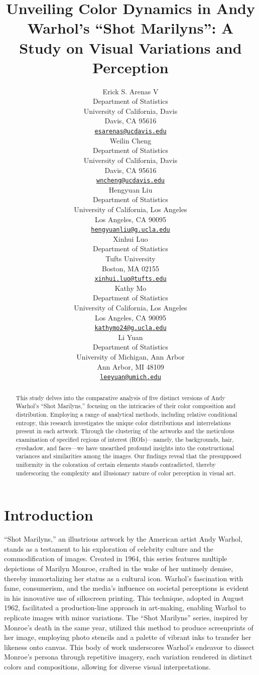 \documentclass{article}
\title{Unveiling Color Dynamics in Andy Warhol's ``Shot Marilyns'': A
Study on Visual Variations and Perception}
\author{
    Erick S. Arenas V
   \\
    Department of Statistics \\
    University of California, Davis \\
  Davis, CA 95616 \\
  \texttt{\href{mailto:esarenas@ucdavis.edu}{\nolinkurl{esarenas@ucdavis.edu}}} \\
   \And
    Weilin Cheng
   \\
    Department of Statistics \\
    University of California, Davis \\
  Davis, CA 95616 \\
  \texttt{\href{mailto:wncheng@ucdavis.edu}{\nolinkurl{wncheng@ucdavis.edu}}} \\
   \And
    Hengyuan Liu
   \\
    Department of Statistics \\
    University of California, Los Angeles \\
  Los Angeles, CA 90095 \\
  \texttt{\href{mailto:hengyuanliu@g.ucla.edu}{\nolinkurl{hengyuanliu@g.ucla.edu}}} \\
   \And
    Xinhui Luo
   \\
    Department of Statistics \\
    Tufts University \\
  Boston, MA 02155 \\
  \texttt{\href{mailto:xinhui.luo@tufts.edu}{\nolinkurl{xinhui.luo@tufts.edu}}} \\
   \And
    Kathy Mo
   \\
    Department of Statistics \\
    University of California, Los Angeles \\
  Los Angeles, CA 90095 \\
  \texttt{\href{mailto:kathymo24@g.ucla.edu}{\nolinkurl{kathymo24@g.ucla.edu}}} \\
   \And
    Li Yuan
   \\
    Department of Statistics \\
    University of Michigan, Ann Arbor \\
  Ann Arbor, MI 48109 \\
  \texttt{\href{mailto:leeyuan@umich.edu}{\nolinkurl{leeyuan@umich.edu}}} \\
  }
\begin{document}
\maketitle


\begin{abstract}
This study delves into the comparative analysis of five distinct
versions of Andy Warhol's ``Shot Marilyns,'' focusing on the intricacies
of their color composition and distribution. Employing a range of
analytical methods, including relative conditional entropy, this
research investigates the unique color distributions and interrelations
present in each artwork. Through the clustering of the artworks and the
meticulous examination of specified regions of interest (ROIs)---namely,
the backgrounds, hair, eyeshadow, and faces---we have unearthed profound
insights into the constructional variances and similarities among the
images. Our findings reveal that the presupposed uniformity in the
coloration of certain elements stands contradicted, thereby underscoring
the complexity and illusionary nature of color perception in visual art.
\end{abstract}


\hypertarget{introduction}{%
\section{Introduction}\label{introduction}}

``Shot Marilyns,'' an illustrious artwork by the American artist Andy
Warhol, stands as a testament to his exploration of celebrity culture
and the commodification of images. Created in 1964, this series features
multiple depictions of Marilyn Monroe, crafted in the wake of her
untimely demise, thereby immortalizing her status as a cultural icon.
Warhol's fascination with fame, consumerism, and the media's influence
on societal perceptions is evident in his innovative use of silkscreen
printing. This technique, adopted in August 1962, facilitated a
production-line approach in art-making, enabling Warhol to replicate
images with minor variations. The ``Shot Marilyns'' series, inspired by
Monroe's death in the same year, utilized this method to produce
screenprints of her image, employing photo stencils and a palette of
vibrant inks to transfer her likeness onto canvas. This body of work
underscores Warhol's endeavor to dissect Monroe's persona through
repetitive imagery, each variation rendered in distinct colors and
compositions, allowing for diverse visual interpretations.
\end{document}
